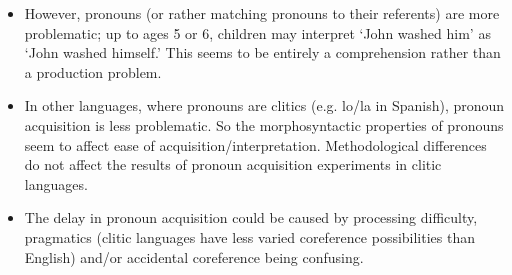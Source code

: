 \documentclass{article}
\begin{document}
\begin{itemize}
    \item However, pronouns (or rather matching pronouns to their referents) are more problematic; up to ages 5 or 6, children may interpret `John washed him' as `John washed himself.' This seems to be entirely a comprehension rather than a production problem.
    \item In other languages, where pronouns are clitics (e.g. lo/la in Spanish), pronoun acquisition is less problematic. So the morphosyntactic properties of pronouns seem to affect ease of acquisition/interpretation. Methodological differences do not affect the results of pronoun acquisition experiments in clitic languages.
    \item The delay in pronoun acquisition could be caused by processing difficulty, pragmatics (clitic languages have less varied coreference possibilities than English) and/or accidental coreference being confusing.
\end{itemize}
\end{document}
